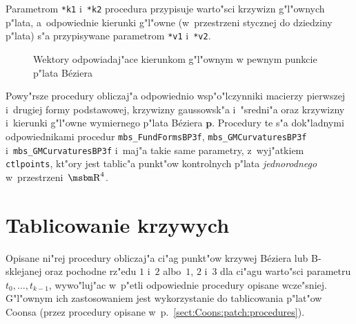 Parametrom \texttt{*k1} i~\texttt{*k2} procedura przypisuje warto"sci
krzywizn g"l"ownych p"lata, a~odpowiednie kierunki g"l"owne (w~przestrzeni
stycznej do dziedziny p"lata) s"a przypisywane parametrom \texttt{*v1}
i~\texttt{*v2}.


\begin{figure}[ht]
  \centerline{}
  \caption{Wektory odpowiadaj"ace kierunkom g"l"ownym w pewnym punkcie
    p"lata B\'{e}ziera}
\end{figure}
\vspace{\bigskipamount}

\begin{sloppypar}
Powy"rsze procedury obliczaj"a odpowiednio wsp"o"lczynniki
macierzy pierwszej i~drugiej formy podstawowej, krzywizny gaussowsk"a
i~"sredni"a oraz krzywizny i~kierunki g"l"owne wymiernego p"lata B\'{e}ziera
$\bm{p}$. Procedury te s"a dok"ladnymi odpowiednikami procedur
\texttt{mbs\_FundFormsBP3f}, \texttt{mbs\_GMCurvaturesBP3f}
i~\texttt{mbs\_GMCurvaturesBP3f} i~maj"a takie same parametry, z~wyj"atkiem
\texttt{ctlpoints}, kt"ory jest tablic"a punkt"ow kontrolnych p"lata
\emph{jednorodnego} w~przestrzeni~$\R^4$.
\end{sloppypar}

\newpage
\section{Tablicowanie krzywych}

Opisane ni"rej procedury obliczaj"a ci"ag punkt"ow krzywej B\'{e}ziera
lub B-sklejanej oraz pochodne rz"edu $1$ i~$2$ albo~$1$, $2$ i~$3$
dla ci"agu warto"sci parametru $t_0,\ldots,t_{k-1}$, wywo"luj"ac
w~p"etli odpowiednie procedury opisane wcze"sniej. G"l"ownym ich
zastosowaniem jest wykorzystanie do tablicowania p"lat"ow Coonsa
(przez procedury opisane w~p.~\ref{sect:Coons:patch:procedures}).

